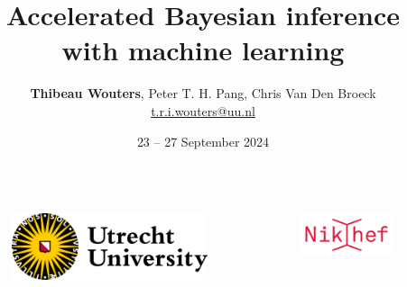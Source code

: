 \documentclass[usenames,dvipsnames,t]{beamer}
\title[XMXS] %
{Accelerated Bayesian inference with machine learning}
\author[Thibeau Wouters]{\small{\textbf{Thibeau Wouters}, Peter T. H. Pang, Chris Van Den Broeck} \\ \vspace{2mm} \href{mailto:t.r.i.wouters@uu.nl}{t.r.i.wouters@uu.nl} \newline \github \quad \linkedin \quad \twitter} %
\date{23 -- 27 September 2024}
\begin{document}
{

  
\begin{frame}[plain]
\titlepage

\begin{columns}
  \begin{figure}
    \centering
    \vspace{1.5mm}
    \includegraphics[width=0.75\linewidth]{Figures/utrecht-university.png}
  \end{figure}
  \begin{figure}
    \centering
    \includegraphics[width=0.75\linewidth]{Figures/Nikhef_logo-transparent.png}
  \end{figure}
\end{columns}

\end{frame}
}
\end{document}

